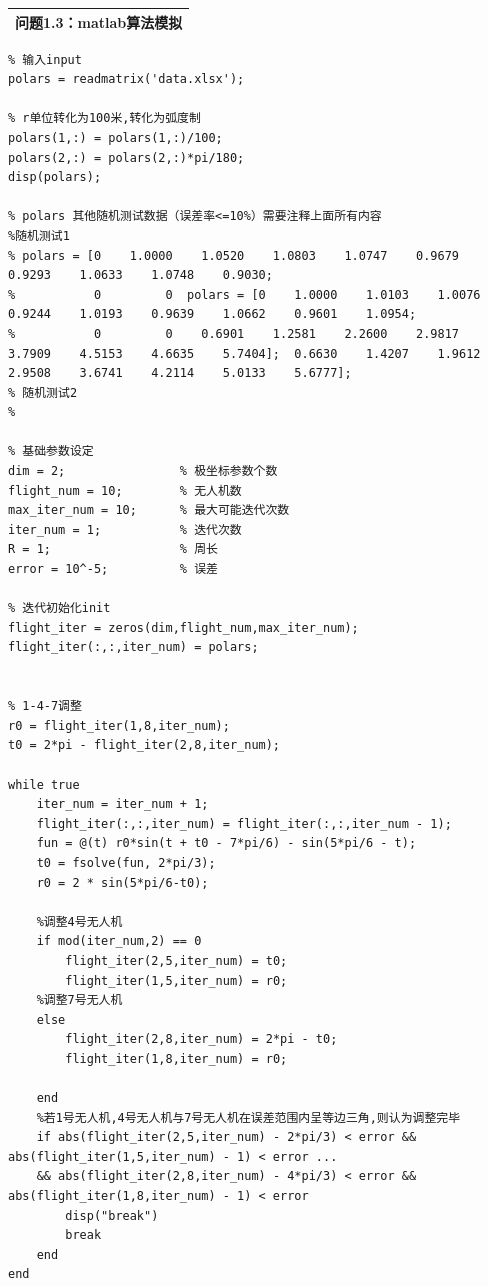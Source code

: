 \documentclass{my_paper}
\begin{document}
\begin{table}[htbp]
    \centering
    \begin{tabular}{|p{14.0cm}|}
    \hline
    \textbf{问题1.3：matlab算法模拟} \\ %
    \hline
    \end{tabular}
\end{table}
\begin{lstlisting}
% 输入input
polars = readmatrix('data.xlsx');

% r单位转化为100米,转化为弧度制
polars(1,:) = polars(1,:)/100;
polars(2,:) = polars(2,:)*pi/180;
disp(polars);

% polars 其他随机测试数据（误差率<=10%）需要注释上面所有内容
%随机测试1
% polars = [0    1.0000    1.0520    1.0803    1.0747    0.9679    0.9293    1.0633    1.0748    0.9030;
%           0         0  polars = [0    1.0000    1.0103    1.0076    0.9244    1.0193    0.9639    1.0662    0.9601    1.0954;
%           0         0    0.6901    1.2581    2.2600    2.9817    3.7909    4.5153    4.6635    5.7404];  0.6630    1.4207    1.9612    2.9508    3.6741    4.2114    5.0133    5.6777];
% 随机测试2
% 

% 基础参数设定
dim = 2;                % 极坐标参数个数
flight_num = 10;        % 无人机数
max_iter_num = 10;      % 最大可能迭代次数
iter_num = 1;           % 迭代次数
R = 1;                  % 周长
error = 10^-5;          % 误差

% 迭代初始化init
flight_iter = zeros(dim,flight_num,max_iter_num);
flight_iter(:,:,iter_num) = polars;


% 1-4-7调整
r0 = flight_iter(1,8,iter_num);
t0 = 2*pi - flight_iter(2,8,iter_num);

while true
    iter_num = iter_num + 1;
    flight_iter(:,:,iter_num) = flight_iter(:,:,iter_num - 1);
    fun = @(t) r0*sin(t + t0 - 7*pi/6) - sin(5*pi/6 - t);
    t0 = fsolve(fun, 2*pi/3);  
    r0 = 2 * sin(5*pi/6-t0);   

    %调整4号无人机
    if mod(iter_num,2) == 0    
        flight_iter(2,5,iter_num) = t0;
        flight_iter(1,5,iter_num) = r0;
    %调整7号无人机
    else 
        flight_iter(2,8,iter_num) = 2*pi - t0;
        flight_iter(1,8,iter_num) = r0;
        
    end
    %若1号无人机,4号无人机与7号无人机在误差范围内呈等边三角,则认为调整完毕
    if abs(flight_iter(2,5,iter_num) - 2*pi/3) < error && abs(flight_iter(1,5,iter_num) - 1) < error ...
    && abs(flight_iter(2,8,iter_num) - 4*pi/3) < error && abs(flight_iter(1,8,iter_num) - 1) < error
        disp("break")
        break
    end
end


\end{lstlisting}
\end{document}
